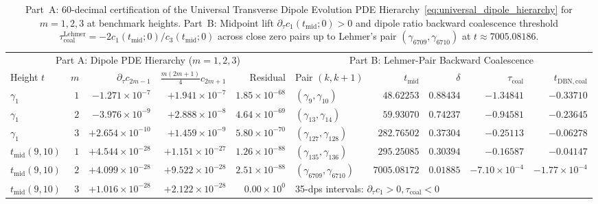 \documentclass[11pt,reqno]{amsart}
\theoremstyle{definition}
\theoremstyle{remark}
\numberwithin{equation}{section}
\begin{document}
\begin{table}[t]
\centering
\caption{Part~A: $60$-decimal certification of the Universal Transverse Dipole Evolution PDE Hierarchy~\eqref{eq:universal_dipole_hierarchy} for $m = 1, 2, 3$ at benchmark heights. Part~B: Midpoint lift $\partial_\tau c_1(t_{\mathrm{mid}};0) > 0$ and dipole ratio backward coalescence threshold $\tau_{\mathrm{coal}}^{\mathrm{Lehmer}} = -2c_1(t_{\mathrm{mid}};0)/c_3(t_{\mathrm{mid}};0)$ across close zero pairs up to Lehmer's pair $(\gamma_{6709}, \gamma_{6710})$ at $t \approx 7005.08186$.}\label{tab:dipole_lehmer}
\scriptsize
\setlength{\tabcolsep}{1.7pt}
\begin{tabular}{@{}lrrrr|lrrrr@{}}
\toprule
\multicolumn{5}{c|}{Part A: Dipole PDE Hierarchy ($m = 1, 2, 3$)} & \multicolumn{5}{c}{Part B: Lehmer-Pair Backward Coalescence} \\
Height $t$ & $m$ & $\partial_\tau c_{2m-1}$ & $\frac{m(2m+1)}{4}c_{2m+1}$ & Residual & Pair $(k,k+1)$ & $t_{\mathrm{mid}}$ & $\delta$ & $\tau_{\mathrm{coal}}$ & $t_{\mathrm{DBN,coal}}$ \\
\midrule
$\gamma_1$               & $1$ & $-1.271\times 10^{-7}$  & $+1.941\times 10^{-7}$  & $1.85\times 10^{-68}$ & $(\gamma_9,\gamma_{10})$        & $48.62253$   & $0.88434$ & $-1.34841$ & $-0.33710$ \\
$\gamma_1$               & $2$ & $-3.976\times 10^{-9}$  & $+2.888\times 10^{-8}$  & $4.64\times 10^{-69}$ & $(\gamma_{13},\gamma_{14})$     & $59.93070$   & $0.74237$ & $-0.94581$ & $-0.23645$ \\
$\gamma_1$               & $3$ & $+2.654\times 10^{-10}$ & $+1.459\times 10^{-9}$  & $5.80\times 10^{-70}$ & $(\gamma_{127},\gamma_{128})$   & $282.76502$  & $0.37304$ & $-0.25113$ & $-0.06278$ \\
$t_{\mathrm{mid}}(9,10)$ & $1$ & $+4.544\times 10^{-28}$ & $+1.151\times 10^{-27}$ & $1.26\times 10^{-88}$ & $(\gamma_{135},\gamma_{136})$   & $295.25085$  & $0.30394$ & $-0.16587$ & $-0.04147$ \\
$t_{\mathrm{mid}}(9,10)$ & $2$ & $+4.099\times 10^{-28}$ & $+9.522\times 10^{-28}$ & $2.51\times 10^{-88}$ & $(\gamma_{6709},\gamma_{6710})$ & $7005.08172$ & $0.01885$ & $-7.10\times 10^{-4}$ & $-1.77\times 10^{-4}$ \\
$t_{\mathrm{mid}}(9,10)$ & $3$ & $+1.016\times 10^{-28}$ & $+2.122\times 10^{-28}$ & $0.00\times 10^{0}$   & \multicolumn{5}{l}{35-dps intervals: $\partial_\tau c_1 > 0, \tau_{\mathrm{coal}} < 0$} \\
\bottomrule
\end{tabular}
\end{table}
\end{document}
